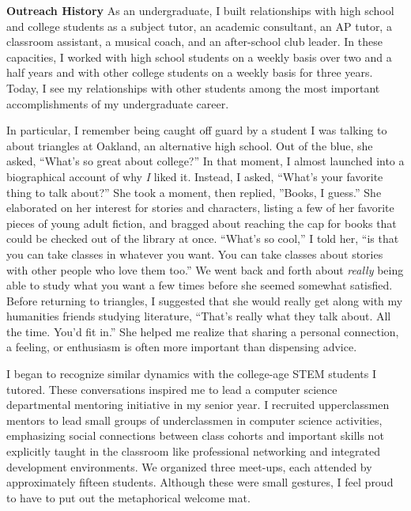\textbf{Outreach History}
As an undergraduate, I built relationships with high school and college students as a subject tutor, an academic consultant, an AP tutor, a classroom assistant, a musical coach, and an after-school club leader.
In these capacities, I worked with high school students on a weekly basis over two and a half years and with other college students on a weekly basis for three years.
Today, I see my relationships with other students among the most important accomplishments of my undergraduate career.

In particular, I remember being caught off guard by a student I was talking to about triangles at Oakland, an alternative high school.
Out of the blue, she asked, ``What's so great about college?''
In that moment, I almost launched into a biographical account of why \textit{I} liked it.
Instead, I asked, ``What's your favorite thing to talk about?''
She took a moment, then replied, ''Books, I guess.''
She elaborated on her interest for stories and characters, listing a few of her favorite pieces of young adult fiction, and bragged about reaching the cap for books that could be checked out of the library at once.
``What's so cool,'' I told her, ``is that you can take classes in whatever you want.
You can take classes about stories with other people who love them too.''
We went back and forth about \textit{really} being able to study what you want a few times before she seemed somewhat satisfied.
Before returning to triangles, I suggested that she would really get along with my humanities friends studying literature,
``That's really what they talk about.
All the time.
You'd fit in.''
She helped me realize that sharing a personal connection, a feeling, or enthusiasm is often more important than dispensing advice.

I began to recognize similar dynamics with the college-age STEM students I tutored.
These conversations inspired me to lead a computer science departmental mentoring initiative in my senior year.
I recruited upperclassmen mentors to lead small groups of underclassmen in computer science activities, emphasizing social connections between class cohorts and important skills not explicitly taught in the classroom like professional networking and integrated development environments.
We organized three meet-ups, each attended by approximately fifteen students.
Although these were small gestures, I feel proud to have to put out the metaphorical welcome mat.
